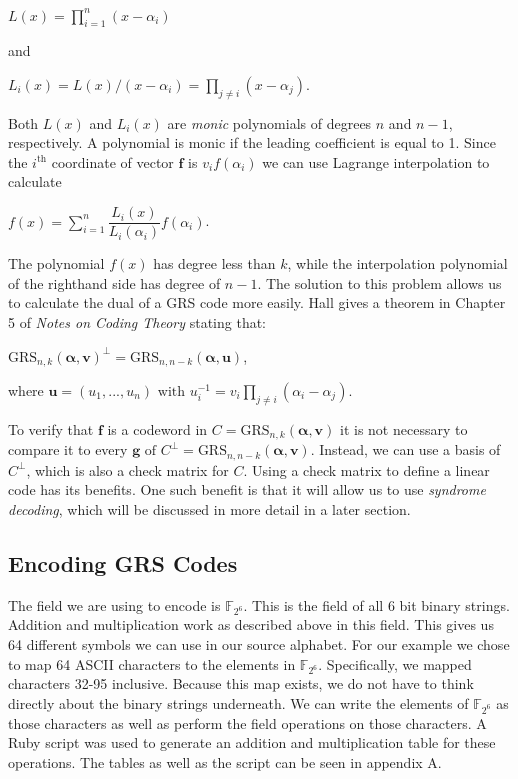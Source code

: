 \documentclass{article}
\begin{document}
\begin{center}
$L(x) = \prod\limits_{i=1}^{n} (x - \alpha_{i})$
\end{center}
and
\begin{center}
$L_{i}(x) = L(x)/(x - \alpha_{i}) = \prod\limits_{j \neq i} (x - \alpha_{j})$.
\end{center}
Both $L(x)$ and $L_{i}(x)$ are \textit{monic} polynomials of degrees $n$ and $n - 1$, respectively. A polynomial is monic if the leading coefficient is equal to 1. Since the $i^{\text{th}}$ coordinate of vector $\textbf{f}$ is $v_{i}f(\alpha_{i})$ we can use Lagrange interpolation to calculate
\begin{center}
$f(x) = \sum\limits_{i=1}^{n} \dfrac{L_{i}(x)}{L_{i}(\alpha_{i})}f(\alpha_{i})$.
\end{center}

The polynomial $f(x)$ has degree less than $k$, while the interpolation polynomial of the righthand side has degree of $n - 1$. The solution to this problem allows us to calculate the dual of a GRS code more easily. Hall gives a theorem in Chapter 5 of \textit{Notes on Coding Theory} stating that:
\begin{center}
$\text{GRS}_{n,k}(\boldsymbol\alpha, \textbf{v})^{\perp} = \text{GRS}_{n,n - k}(\boldsymbol\alpha, \textbf{u})$,
\end{center}
where $\textbf{u} = (u_{1},...,u_{n}) \text{ with } u_{i}^{-1} = v_{i}\prod\limits_{j \neq i} (\alpha_{i} - \alpha_{j})$.

To verify that $\textbf{f}$ is a codeword in $C = \text{GRS}_{n,k}(\boldsymbol\alpha, \textbf{v})$ it is not necessary to compare it to every $\textbf{g} \text{ of } C^{\perp} = \text{GRS}_{n,n-k}(\boldsymbol\alpha, \textbf{v})$. Instead, we can use a basis of $C^{\perp}$, which is also a check matrix for $C$. Using a check matrix to define a linear code has its benefits. One such benefit is that it will allow us to use \textit{syndrome decoding}, which will be discussed in more detail in a later section.

\subsection{Encoding GRS Codes}
The field we are using to encode is $\mathbb{F}_{2^{6}}$. This is the field of all 6 bit binary strings. Addition and multiplication work as described above in this field. This gives us 64 different symbols we can use in our source alphabet. For our example we chose to map 64 ASCII characters to the elements in $\mathbb{F}_{2^{6}}$. Specifically, we mapped characters 32-95 inclusive. Because this map exists, we do not have to think directly about the binary strings underneath. We can write the elements of $\mathbb{F}_{2^{6}}$ as those characters as well as perform the field operations on those characters. A Ruby script was used to generate an addition and multiplication table for these operations. The tables as well as the script can be seen in appendix A. 
\end{document}
